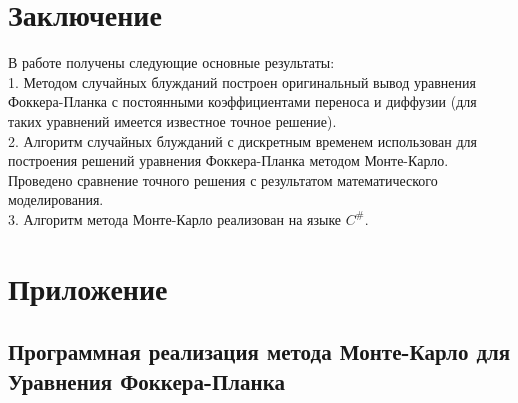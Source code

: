 \documentclass[a4paper]{report}
\begin{document}
\newpage
{}
\section*{Заключение}

В работе получены следующие основные результаты:
\\1. Методом случайных блужданий построен оригинальный вывод уравнения Фоккера-Планка с постоянными коэффициентами переноса и диффузии (для таких уравнений имеется известное точное решение).
\\2. Алгоритм случайных блужданий с дискретным временем использован для построения решений уравнения Фоккера-Планка методом Монте-Карло. Проведено сравнение точного решения с результатом математического моделирования.
\\3. Алгоритм метода Монте-Карло реализован на языке $C^\#$.


\newpage
{}
\section*{Приложение}
\subsection*{Программная реализация метода Монте-Карло для Уравнения Фоккера-Планка}
\end{document}
